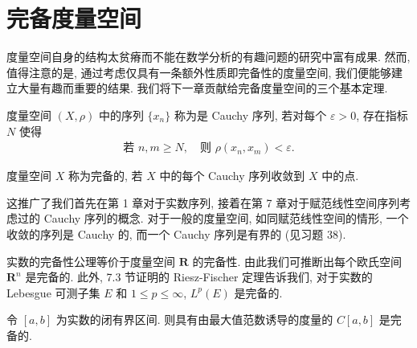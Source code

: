 \documentclass[../../main.tex]{subfiles}
\begin{document}
\section{完备度量空间}\label{section:ch09-完备度量空间}

度量空间自身的结构太贫瘠而不能在数学分析的有趣问题的研究中富有成果. 然而, 值得注意的是, 通过考虑仅具有一条额外性质即完备性的度量空间, 我们便能够建立大量有趣而重要的结果. 我们将下一章贡献给完备度量空间的三个基本定理.

\begin{definition}\label{definition:ch09-Cauchy完备}
度量空间 $(X,\rho)$ 中的序列 $\{x_{n}\}$ 称为是 Cauchy 序列, 若对每个 $\varepsilon>0$, 存在指标 $N$ 使得
\begin{align*}
\text{若 }n,m\geqslant N,\quad\text{则 }\rho(x_{n},x_{m})<\varepsilon.
\end{align*}

度量空间 $X$ 称为完备的, 若 $X$ 中的每个 Cauchy 序列收敛到 $X$ 中的点.
\end{definition}

这推广了我们首先在第 1 章对于实数序列, 接着在第 7 章对于赋范线性空间序列考虑过的 Cauchy 序列的概念. 对于一般的度量空间, 如同赋范线性空间的情形, 一个收敛的序列是 Cauchy 的, 而一个 Cauchy 序列是有界的 (见习题 38).

实数的完备性公理等价于度量空间 $\mathbf{R}$ 的完备性. 由此我们可推断出每个欧氏空间 $\mathbf{R}^{n}$ 是完备的. 此外, 7.3 节证明的 Riesz-Fischer 定理告诉我们, 对于实数的 Lebesgue 可测子集 $E$ 和 $1\leqslant p\leqslant\infty$, $L^{p}(E)$ 是完备的.

\begin{proposition}\label{proposition:ch09-Cab完备}
令 $[a,b]$ 为实数的闭有界区间. 则具有由最大值范数诱导的度量的 $C[a,b]$ 是完备的.
\end{proposition}
\end{document}
